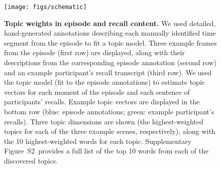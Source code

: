 \documentclass[10pt]{article}
\newcommand{\topics}{S2}
\begin{document}
\begin{figure}[tp]
\centering
\texttt{[image: figs/schematic]}
\caption{\small \textbf{Topic weights in episode and recall content.} We used detailed, hand-generated annotations describing each manually identified time segment from the episode to fit a topic model.  Three example frames from the episode (first row) are displayed, along with their descriptions from the corresponding episode annotation (second row) and an example participant's recall transcript (third row).  We used the topic model (fit to the episode annotations) to estimate topic vectors for each moment of the episode and each sentence of participants' recalls.  Example topic vectors are displayed in the bottom row (blue: episode annotations; green: example participant's recalls).  Three topic dimensions are shown (the highest-weighted topics for each of the three example scenes, respectively), along with the 10 highest-weighted words for each topic.  Supplementary Figure~\topics~provides a full list of the top 10 words from each of the discovered topics.}
\label{fig:schematic}
\end{figure}
\end{document}
